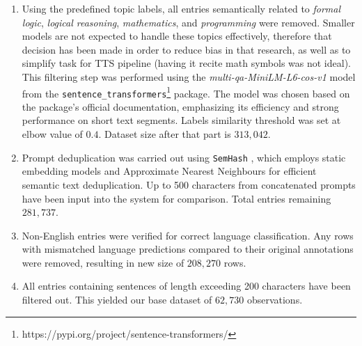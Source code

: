 \begin{appendices}
\begin{enumerate}
        \item Using the predefined topic labels, all entries semantically related to \textit{formal logic}, \textit{logical reasoning}, \textit{mathematics}, and \textit{programming} were removed. Smaller models are not expected to handle these topics effectively, therefore that decision has been made in order to reduce bias in that research, as well as to simplify task for TTS pipeline (having it recite math symbols was not ideal). This filtering step was performed using the \textit{multi-qa-MiniLM-L6-cos-v1} model from the \texttt{sentence\_transformers}\footnote{https://pypi.org/project/sentence-transformers/} package. The model was chosen based on the package's official documentation, emphasizing its efficiency and strong performance on short text segments. Labels similarity threshold was set at elbow value of $0.4$. Dataset size after that part is $313,042$.

        \item Prompt deduplication was carried out using \texttt{SemHash} \parencite{minishlab2025semhash}, which employs static embedding models and Approximate Nearest Neighbours \parencite{Indyk1998} for efficient semantic text deduplication. Up to 500 characters from concatenated prompts have been input into the system for comparison. Total entries remaining $281,737$.

        \item Non-English entries were verified for correct language classification. Any rows with mismatched language predictions compared to their original annotations were removed, resulting in new size of $208,270$ rows.

        \item All entries containing sentences of length exceeding 200 characters have been filtered out. This yielded our base dataset of $62,730$ observations.

    \end{enumerate}


\end{appendices}
